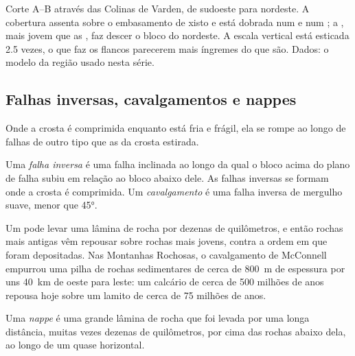 \begin{omfigure}
{\small Corte A--B através das Colinas de Varden, de sudoeste para nordeste.
A cobertura assenta sobre o embasamento de xisto e está dobrada num
 e num ; a , mais jovem que as , faz
descer o bloco do nordeste. A escala vertical está esticada 2.5 vezes, o
que faz os flancos parecerem mais íngremes do que são. Dados: o modelo da
região usado nesta série.}
\end{omfigure}

\subsection{Falhas inversas, cavalgamentos e nappes}

Onde a crosta é comprimida enquanto está fria e frágil, ela se rompe ao
longo de falhas de outro tipo que as  da crosta estirada.

\begin{definition}\label{def:g12:mountain-building:thrust}
Uma \emph{falha inversa} é uma falha inclinada ao longo
da qual o bloco acima do plano de falha subiu em relação ao bloco abaixo
dele. As falhas inversas se formam onde a crosta é comprimida. Um
\emph{cavalgamento} é uma falha inversa de mergulho
suave, menor que \ang{45}.
\end{definition}

Um  pode levar uma lâmina de rocha por dezenas de quilômetros,
e então rochas mais antigas vêm repousar sobre rochas mais jovens, contra a
ordem em que foram depositadas. Nas Montanhas Rochosas, o cavalgamento de
McConnell empurrou uma pilha de rochas sedimentares de cerca de
\qty{800}{m} de espessura por uns \qty{40}{km} de oeste para leste: um
calcário de cerca de 500 milhões de anos repousa hoje sobre um lamito de
cerca de 75 milhões de anos.

\begin{definition}[Nappe]\label{def:g12:mountain-building:nappe}
Uma \emph{nappe} é uma grande lâmina de rocha que foi levada
por uma longa distância, muitas vezes dezenas de quilômetros, por cima das
rochas abaixo dela, ao longo de um  quase horizontal.
\end{definition}

